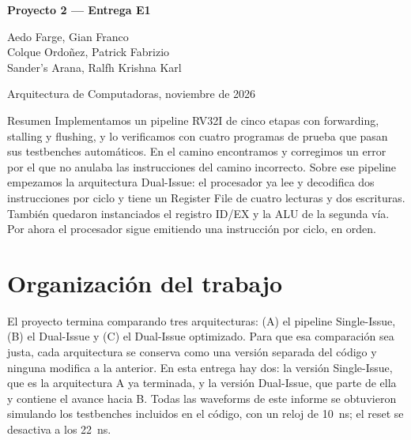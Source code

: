 \documentclass[11pt,a4paper]{article}
\newcommand{\sig}[1]{\texttt{\detokenize{#1}}}
\begin{document}
\begin{center}
  {\LARGE\bfseries\color{acento} Proyecto 2 --- Entrega E1\par}
  \vspace{10pt}
  Aedo Farge, Gian Franco\\
  Colque Ordoñez, Patrick Fabrizio\\
  Sander's Arana, Ralfh Krishna Karl\par
  \vspace{8pt}
  {\small Arquitectura de Computadoras, noviembre de 2026\par}
\end{center}

\begin{nota}{Resumen}
Implementamos un pipeline RV32I de cinco etapas con forwarding, stalling y flushing, y lo verificamos con cuatro programas de prueba que pasan sus testbenches automáticos. En el camino encontramos y corregimos un error por el que \sig{jalr} no anulaba las instrucciones del camino incorrecto. Sobre ese pipeline empezamos la arquitectura Dual-Issue: el procesador ya lee y decodifica dos instrucciones por ciclo y tiene un Register File de cuatro lecturas y dos escrituras. También quedaron instanciados el registro ID/EX y la ALU de la segunda vía. Por ahora el procesador sigue emitiendo una instrucción por ciclo, en orden.
\end{nota}

\section{Organización del trabajo}

El proyecto termina comparando tres arquitecturas: (A) el pipeline Single-Issue, (B) el Dual-Issue y (C) el Dual-Issue optimizado. Para que esa comparación sea justa, cada arquitectura se conserva como una versión separada del código y ninguna modifica a la anterior. En esta entrega hay dos: la versión Single-Issue, que es la arquitectura A ya terminada, y la versión Dual-Issue, que parte de ella y contiene el avance hacia B. Todas las waveforms de este informe se obtuvieron simulando los testbenches incluidos en el código, con un reloj de 10~ns; el reset se desactiva a los 22~ns.
\end{document}
